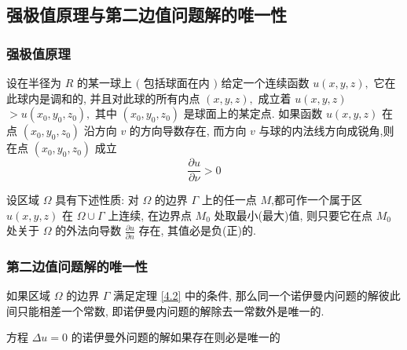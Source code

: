 \documentclass[10pt]{yerbaformat}
\begin{document}

\subsection{强极值原理与第二边值问题解的唯一性}
\subsubsection{强极值原理}

\begin{theorem}[强极值原理]
    设在半径为 $R$ 的某一球上 $($ 包括球面在内 $)$ 给定一个连续函数 $u(x, y, z),$ 它在此球内是调和的, 并且对此球的所有内点 $(x, y, z),$ 成立着 $u(x, y, z)$ $>u\left(x_{0}, y_{0}, z_{0}\right),$ 其中 $\left(x_{0}, y_{0}, z_{0}\right)$ 是球面上的某定点. 如果函数 $u(x, y, z)$ 在点 $(x_{0}, y_{0}, z_{0})$ 沿方向 $v$ 的方向导数存在, 而方向 $v$ 与球的内法线方向成锐角,则在点 $\left(x_{0}, y_{0}, z_{0}\right)$ 成立
    $$
    \frac{\partial u}{\partial \nu}>0
    $$
\end{theorem}

\begin{theorem}\label{4.2}
    设区域 $\Omega$ 具有下述性质: 对 $\Omega$ 的边界 $\Gamma$ 上的任一点 $M$,都可作一个属于区 $u(x, y, z)$ 在 $\Omega \cup \Gamma$ 上连续, 在边界点 $M_{0}$ 处取最小(最大)值, 则只要它在点 $M_{0}$ 处关于 $\Omega$ 的外法向导数 $\frac{\partial u}{\partial n}$ 存在, 其值必是负(正)的.
\end{theorem}

\subsubsection{第二边值问题解的唯一性}

\begin{theorem}
    如果区域 $\Omega$ 的边界 $\Gamma$ 满足定理 \ref{4.2} 中的条件, 那么同一个诺伊曼内问题的解彼此间只能相差一个常数, 即诺伊曼内问题的解除去一常数外是唯一的.
\end{theorem}

\begin{theorem}
    方程 $\Delta u =0$ 的诺伊曼外问题的解如果存在则必是唯一的
\end{theorem}

\end{document}
